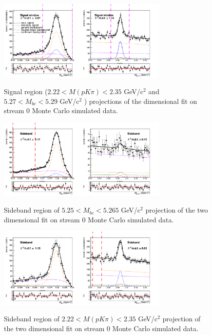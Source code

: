 \begin{figure}[h!]
{\includegraphics[width=0.75\textwidth]{A3-Appendix/figs/Signal_window_Total_2DFit_stream0_chargedAnticorrLambdaC_Crossfeed_fraction.png}}
\caption{Signal region ($2.22 < M(p K \pi) < 2.35$ GeV/c$^2$ and $5.27 < M_{bc} < 5.29$ GeV/c$^2$ ) projections of the dimensional fit on stream 0 Monte Carlo simulated data.}
\label{fig:stream0_sig_window_Total2Dfit_charged_anticorrLambdaC}
\end{figure}

\begin{figure}[h!]
{\includegraphics[width=0.75\textwidth]{A3-Appendix/figs/Mbc_Sideband_Total_2DFit_stream0_chargedAnticorrLambdaC_Crossfeed_fraction.png}}
\caption{Sideband region of $5.25 < M_{bc} < 5.265$ GeV/c$^2$ projection of the two dimensional fit on stream 0 Monte Carlo simulated data.}
\label{fig:stream0_MbcSideband_Total2Dfit_charged_anticorrLambdaC}
\end{figure}

\begin{figure}[b]
{\includegraphics[width=0.75\textwidth]{A3-Appendix/figs/InvM_Sideband2_Total_2DFit_stream0_chargedAnticorrLambdaC_Crossfeed_fraction.png}}
\caption{Sideband region of $2.22 < M(p K \pi) < 2.35$ GeV/c$^2$ projection of the two dimensional fit on stream 0 Monte Carlo simulated data.}
\label{fig:stream0_InvMSideband_Total2Dfit_charged_anticorrLambdaC}
\end{figure}


